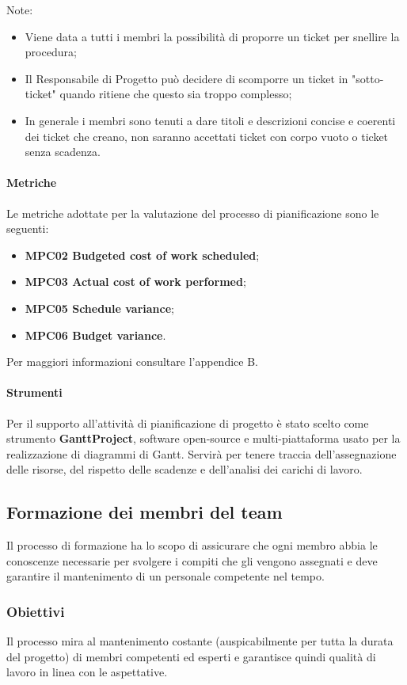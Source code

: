 Note:
\begin{itemize}
\item Viene data a tutti i membri la possibilità di proporre un ticket per snellire la procedura;
\item Il Responsabile di Progetto può decidere di scomporre un ticket in "sotto-ticket" quando ritiene che questo sia troppo complesso;
\item In generale i membri sono tenuti a dare titoli e descrizioni concise e coerenti dei ticket che creano, non saranno accettati ticket con corpo vuoto o ticket senza scadenza.
\end{itemize}

\paragraph{Metriche}
Le metriche adottate per la valutazione del processo di pianificazione sono le seguenti:
\begin{itemize}
\item \textbf{MPC02 Budgeted cost of work scheduled};
\item \textbf{MPC03 Actual cost of work performed};
\item \textbf{MPC05 Schedule variance};
\item \textbf{MPC06 Budget variance}.
\end{itemize} 
Per maggiori informazioni consultare l'appendice B.

\paragraph{Strumenti}
Per il supporto all’attività di pianificazione di progetto è stato scelto come strumento
\textbf{GanttProject}, software open-source e multi-piattaforma usato per la realizzazione di diagrammi di Gantt. Servirà per tenere traccia dell'assegnazione delle risorse, del rispetto delle scadenze e dell'analisi dei carichi di lavoro.


\subsection{Formazione dei membri del team}
Il processo di formazione ha lo scopo di assicurare che ogni membro abbia le conoscenze necessarie per svolgere i compiti che gli vengono assegnati e deve garantire il mantenimento di un personale competente nel tempo.

\subsubsection{Obiettivi}
Il processo mira al mantenimento costante (auspicabilmente per tutta la durata del progetto) di membri competenti ed esperti e garantisce quindi qualità di lavoro in linea con le aspettative.

